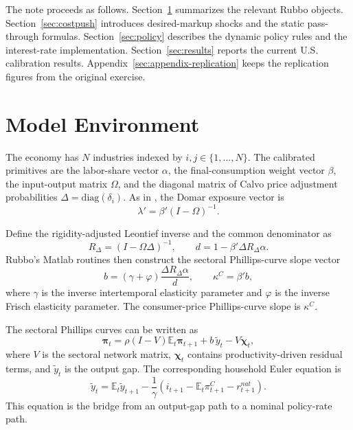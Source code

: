 \documentclass[12pt]{article}
\newcommand{\E}{\mathbb{E}}
\newcommand{\RDelta}{R_{\Delta}}
\newcommand{\ytilde}{\tilde y}
\begin{document}
The note proceeds as follows. Section~\ref{sec:model} summarizes the relevant Rubbo
objects. Section~\ref{sec:costpush} introduces desired-markup shocks and the static
pass-through formulas. Section~\ref{sec:policy} describes the dynamic policy rules and
the interest-rate implementation. Section~\ref{sec:results} reports the current U.S.
calibration results. Appendix~\ref{sec:appendix-replication} keeps the replication
figures from the original exercise.

\section{Model Environment}
\label{sec:model}

The economy has $N$ industries indexed by $i,j \in \{1,\ldots,N\}$. The calibrated
primitives are the labor-share vector $\alpha$, the final-consumption weight vector
$\beta$, the input-output matrix $\Omega$, and the diagonal matrix of Calvo price
adjustment probabilities $\Delta=\mathrm{diag}(\delta_i)$. As in
\citet{rubbo2023networks}, the Domar exposure vector is
\begin{equation}
    \lambda'
    =
    \beta'(I-\Omega)^{-1}.
    \label{eq:domar}
\end{equation}

Define the rigidity-adjusted Leontief inverse and the common denominator as
\begin{equation}
    \RDelta=(I-\Omega\Delta)^{-1},
    \qquad
    d=1-\beta'\Delta\RDelta\alpha .
    \label{eq:rdeltad}
\end{equation}
Rubbo's Matlab routines then construct the sectoral Phillips-curve slope vector
\begin{equation}
    b
    =
    (\gamma+\varphi)
    \frac{\Delta\RDelta\alpha}{d},
    \qquad
    \kappa^C=\beta'b,
    \label{eq:slope}
\end{equation}
where $\gamma$ is the inverse intertemporal elasticity parameter and $\varphi$ is the
inverse Frisch elasticity parameter. The consumer-price Phillips-curve slope is
$\kappa^C$.

The sectoral Phillips curves can be written as
\begin{equation}
    \bm{\pi}_t
    =
    \rho(I-V)\E_t\bm{\pi}_{t+1}
    +
    b\,\ytilde_t
    -
    V\bm{\chi}_t,
    \label{eq:baseline-sectoral-pc}
\end{equation}
where $V$ is the sectoral network matrix, $\bm{\chi}_t$ contains productivity-driven
residual terms, and $\ytilde_t$ is the output gap. The corresponding household Euler
equation is
\begin{equation}
    \ytilde_t
    =
    \E_t\ytilde_{t+1}
    -
    \frac{1}{\gamma}
    \left(
        i_{t+1}
        -
        \E_t\pi^C_{t+1}
        -
        r^{nat}_{t+1}
    \right).
    \label{eq:is}
\end{equation}
This equation is the bridge from an output-gap path to a nominal policy-rate path.
\end{document}
